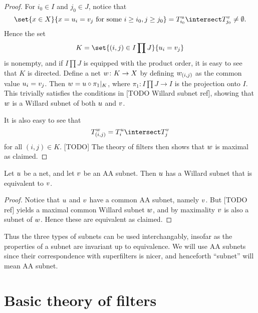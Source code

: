 \documentclass[article, a4paper, 11pt, oneside]{memoir}
\numberwithin{equation}{chapter}
\theoremstyle{nonumberplain}
\begin{document}
\begin{proof}
    For $i_0 \in I$ and $j_0 \in J$, notice that
    \begin{equation*}
        \set{x \in X}{x = \mynet_i = \altnet_j \text{ for some } i \geq i_0, j \geq j_0}
            = \tail[\mynet]{i_0} \intersect \tail[\altnet]{j_0}
            \neq \emptyset.
    \end{equation*}
    Hence the set
    \begin{equation*}
        K
            = \set{(i,j) \in I \prod J}{\mynet_i = \altnet_j}
    \end{equation*}
    is nonempty, and if $I \prod J$ is equipped with the product order, it is easy to see that $K$ is directed. Define a net $w \colon K \to X$ by defining $w_{(i,j)}$ as the common value $u_i = v_j$. Then $w = u \circ \pi_1|_K$, where $\pi_1 \colon I \prod J \to I$ is the projection onto $I$. This trivially satisfies the conditions in [TODO Willard subnet ref], showing that $w$ is a Willard subnet of both $u$ and $v$.
    
    It is also easy to see that
    \begin{equation*}
        \tail[\newnet]{(i,j)}
            = \tail[\mynet]{i} \intersect \tail[\altnet]{j}
    \end{equation*}
    for all $(i,j) \in K$. [TODO] The theory of filters then shows that $w$ is maximal as claimed.
\end{proof}


\begin{corollary}
    Let $u$ be a net, and let $v$ be an AA subnet. Then $u$ has a Willard subnet that is equivalent to $v$.
\end{corollary}

\begin{proof}
    Notice that $u$ and $v$ have a common AA subnet, namely $v$. But [TODO ref] yields a maximal common Willard subnet $w$, and by maximality $v$ is also a subnet of $w$. Hence these are equivalent as claimed.
\end{proof}
%
Thus the three types of subnets can be used interchangably, insofar as the properties of a subnet are invariant up to equivalence. We will use AA subnets since their correspondence with superfilters is nicer, and henceforth \enquote{subnet} will mean AA subnet.



\section{Basic theory of filters}
\end{document}
